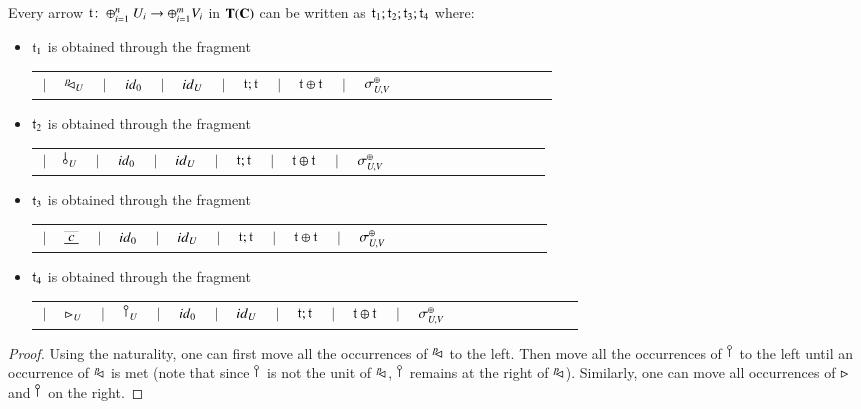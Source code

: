 \begin{lemma}\label{lemma:prenormalform}%
Every arrow $\mathfrak{t}\colon \oplus_{i=1}^n U_i\to \oplus_{i=1}^m V_i$ in $\mathbf{T}(\mathbf{C})$ can be written as $\mathfrak{t}_1;\mathfrak{t}_2;\mathfrak{t}_3;\mathfrak{t}_4$ where:
\begin{itemize}
    \item $\mathfrak{t}_1$ is obtained through the fragment \setlength{\tabcolsep}{4pt}\begin{tabular}{rc ccccccccccccccccccccc}
   $\!\!\! \mid \!\!\!$ & $^p\!\! \lhd_{U}$  & $\!\!\! \mid \!\!\!$  & ${id}_{0}$ & $\!\!\! \mid \!\!\!$ &  ${id}_{U}$ & $\!\!\! \mid \!\!\!$   & $   \mathfrak{t} ; \mathfrak{t}   $ & $\!\!\! \mid \!\!\!$  & $  \mathfrak{t} \oplus \mathfrak{t}  $ & $\!\!\! \mid \!\!\!$  &  $\sigma_{U,V}^{\oplus}$
\end{tabular}
\item $\mathfrak{t}_2$ is obtained through the fragment \setlength{\tabcolsep}{4pt}\begin{tabular}{rc ccccccccccccccccccccc}
           $\!\!\! \mid \!\!\!$  &  $\bangp{U}$& $\!\!\! \mid \!\!\!$&  ${id}_{0}$ & $\!\!\! \mid \!\!\!$ & ${id}_{U}$    & $\!\!\! \mid \!\!\!$   & $   \mathfrak{t} ; \mathfrak{t}   $ & $\!\!\! \mid \!\!\!$  & $  \mathfrak{t} \oplus \mathfrak{t}  $ & $\!\!\! \mid \!\!\!$  &  $\sigma_{U,V}^{\oplus}$
    \end{tabular}
    \item $\mathfrak{t}_3$ is obtained through the fragment \begin{tabular}{rc ccccccccccccccccccccc}\setlength{\tabcolsep}{0.0pt}
        $\!\!\! \mid \!\!\!$ & $\tapeFunct{c}$  & $\!\!\! \mid \!\!\!$  &  ${id}_{0}$ & $\!\!\! \mid \!\!\!$ & ${id}_{U}$&  $\!\!\! \mid \!\!\!$   & $   \mathfrak{t} ; \mathfrak{t}   $ & $\!\!\! \mid \!\!\!$  & $  \mathfrak{t} \oplus \mathfrak{t}  $ & $\!\!\! \mid \!\!\!$  &  $\sigma_{U,V}^{\oplus}$
    \end{tabular}
    \item $\mathfrak{t}_4$ is obtained through the fragment \begin{tabular}{rc ccccccccccccccccccccc}%
        $\!\!\! \mid \!\!\!$ & $\rhd_{U}$ &$\!\!\! \mid \!\!\!$ & $\cobang{U}$ & $\!\!\! \mid \!\!\!$  &  ${id}_{0}$ & $\!\!\! \mid \!\!\!$ & ${id}_{U}$ & $\!\!\! \mid \!\!\!$   & $   \mathfrak{t} ; \mathfrak{t}   $ & $\!\!\! \mid \!\!\!$  & $  \mathfrak{t} \oplus \mathfrak{t}  $ & $\!\!\! \mid \!\!\!$  &  $\sigma_{U,V}^{\oplus}$
    \end{tabular}
\end{itemize}
\end{lemma}
\begin{proof}
Using the naturality, one can first move all the occurrences of $^p\!\! \lhd_{}$ to the left. Then move all the occurrences of $\cobang{}$ to the left until an occurrence of $^p\!\! \lhd_{}$ is met (note that since $\cobang{}$ is not the unit of $^p\!\! \lhd_{}$, $\cobang{}$ remains at the right of $^p\!\! \lhd_{}$). Similarly, one can move all occurrences of $\rhd_{}$ and $\cobang{}$ on the right.
\end{proof}




